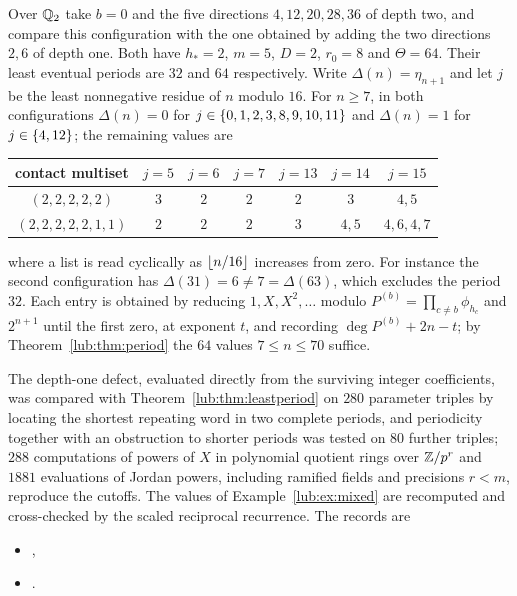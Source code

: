 \begin{example}\label{lub:ex:mixed}
Over $\mathbb{Q}_2$ take $b=0$ and the five directions $4,12,20,28,36$ of depth two, and compare
this configuration with the one obtained by adding the two directions $2,6$ of depth one.
Both have $h_*=2$, $m=5$, $D=2$, $r_0=8$ and $\Theta=64$. Their least eventual periods are
$32$ and $64$ respectively. Write $\Delta(n)=\eta_{n+1}$ and let $j$ be the least nonnegative
residue of $n$ modulo $16$. For $n\ge7$, in both configurations $\Delta(n)=0$ for
$j\in\{0,1,2,3,8,9,10,11\}$ and $\Delta(n)=1$ for $j\in\{4,12\}$; the remaining values are
\begin{center}\small
\begin{tabular}{c|cccccc}
\toprule
contact multiset & $j=5$ & $j=6$ & $j=7$ & $j=13$ & $j=14$ & $j=15$\\
\midrule
$(2,2,2,2,2)$ & $3$ & $2$ & $2$ & $2$ & $3$ & $4,5$\\
$(2,2,2,2,2,1,1)$ & $2$ & $2$ & $2$ & $3$ & $4,5$ & $4,6,4,7$\\
\bottomrule
\end{tabular}
\end{center}
where a list is read cyclically as $\lfloor n/16\rfloor$ increases from zero. For instance the
second configuration has $\Delta(31)=6\ne7=\Delta(63)$, which excludes the period $32$. Each
entry is obtained by reducing $1,X,X^2,\dots$ modulo $P^{(b)}=\prod_{c\ne b}\phi_{h_c}$ and
$2^{n+1}$ until the first zero, at exponent $t$, and recording $\deg P^{(b)}+2n-t$; by
Theorem~\ref{lub:thm:period} the $64$ values $7\le n\le70$ suffice.
\end{example}

\begin{remark}\label{lub:rem:periodchecks}
The depth-one defect, evaluated directly from the surviving integer coefficients, was
compared with Theorem~\ref{lub:thm:leastperiod} on $280$ parameter triples by locating the
shortest repeating word in two complete periods, and periodicity together with an obstruction
to shorter periods was tested on $80$ further triples; $288$ computations of powers of $X$ in
polynomial quotient rings over $\mathbb{Z}/p^r$ and $1881$ evaluations of Jordan powers, including
ramified fields and precisions $r<m$, reproduce the cutoffs. The values of
Example~\ref{lub:ex:mixed} are recomputed and cross-checked by the scaled reciprocal
recurrence. The records are
\begin{itemize}[leftmargin=2em]
\item {},
\item {}.
\end{itemize}
\end{remark}

